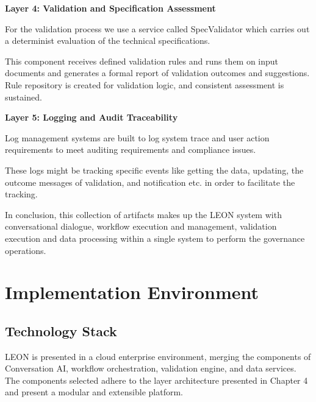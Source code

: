 \textcolor[HTML]{0066CC}{\textbf{Layer 4: Validation and Specification Assessment}}

For the validation process we use a service called SpecValidator which carries out a determinist evaluation of the technical specifications.

This component receives defined validation rules and runs them on input documents  and generates a formal report of validation outcomes and suggestions.  Rule repository is created for validation logic,  and consistent assessment is sustained.

\vspace{0.4cm}

\textcolor[HTML]{0066CC}{\textbf{Layer 5: Logging and Audit Traceability}}

Log management systems are built to log system trace and user action requirements to meet auditing requirements and compliance issues.

These logs might be tracking specific events like getting the data, updating, the outcome messages of validation, and notification etc. in order to facilitate the tracking.

\vspace{0.4cm}

In conclusion,  this collection of artifacts makes up the LEON system with conversational dialogue, workflow execution and management, validation execution and data processing within a single system to perform the governance operations.

\section{\textcolor[HTML]{0066CC}{Implementation Environment}}
\label{sec:impl-environment}

\subsection{\textcolor[HTML]{003D99}{Technology Stack}}

LEON is presented in a cloud enterprise environment, merging the components of Conversation AI, workflow orchestration, validation engine, and data services. The components selected adhere to the layer architecture presented in Chapter 4 and present a modular and extensible platform.

